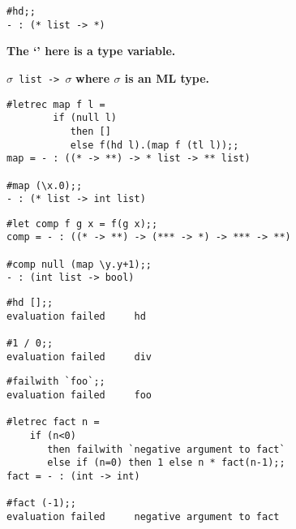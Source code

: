 \begin{session}\begin{verbatim}
#hd;;
- : (* list -> *)
\end{verbatim}\end{session}
\vskip1mm
\bpindent\LARGE\bf
The `{\tt *}' here is a type variable.
\epindent

\vskip5mm


\vskip7mm
\bspindent\LARGE
 {\tt $\sigma$ list -> $\sigma$} 
\espindent 
\vskip7mm
\bpindent\LARGE\bf
where $\sigma$ is an ML type. 
\epindent




\vskip4mm

\begin{session}\begin{verbatim}
#letrec map f l =
        if (null l)
           then []
           else f(hd l).(map f (tl l));;
map = - : ((* -> **) -> * list -> ** list)

#map (\x.0);;
- : (* list -> int list)
\end{verbatim}\end{session}

\begin{session}\begin{verbatim}
#let comp f g x = f(g x);;
comp = - : ((* -> **) -> (*** -> *) -> *** -> **)

#comp null (map \y.y+1);;
- : (int list -> bool)
\end{verbatim}\end{session}



\begin{session}\begin{verbatim}
#hd [];;
evaluation failed     hd

#1 / 0;;
evaluation failed     div
\end{verbatim}\end{session}

\begin{session}\begin{verbatim}
#failwith `foo`;;
evaluation failed     foo

#letrec fact n =
    if (n<0)
       then failwith `negative argument to fact`
       else if (n=0) then 1 else n * fact(n-1);;
fact = - : (int -> int)

#fact (-1);;
evaluation failed     negative argument to fact
\end{verbatim}\end{session}

